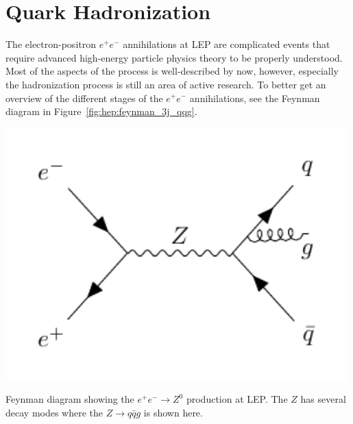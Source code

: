  

\FloatBarrier
\section{Quark Hadronization}
\label{sec:hep:quark_hadronization}

The electron-positron $e^+ e^-$ annihilations at LEP are complicated events that require advanced high-energy particle physics theory to be properly understood. Most of the aspects of the process is well-described by now, however, especially the hadronization process is still an area of active research. To better get an overview of the different stages of the $e^+e^-$ annihilations, see the Feynman diagram in Figure~\ref{fig:hep:feynman_3j_qqg}. 

\begin{marginfigure}
  \centerfloat
  \includegraphics[width=0.99\textwidth, trim=10 10 10 10, clip]{figures/feynman_diagrams/eeZqqg.pdf}
  \caption[Feynman diagram for the jet production at LEP]{Feynman diagram showing the $e^+ e^- \rightarrow Z^0$ production at LEP. The $Z$ has several decay modes where the $Z \rightarrow q\bar{q}g$ is shown here.}
  \label{fig:hep:feynman_3j_qqg}
\end{marginfigure}

